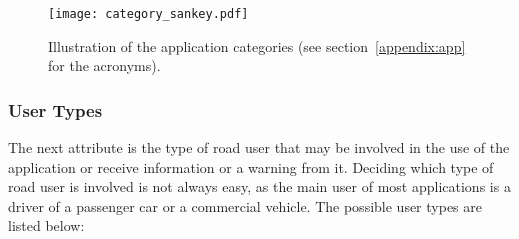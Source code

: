 
\begin{figure}[ht!]
  \begin{center}
    \texttt{[image: category\_sankey.pdf]}
    \caption{Illustration of the application categories (see section~\ref{appendix:app} for the acronyms).}
    \label{fig:app-category}
  \end{center}
\end{figure}

\subsubsection{User Types}
The next attribute is the type of road user that may be involved in the use of the application or receive information or a warning from it.
Deciding which type of road user is involved is not always easy, as the main user of most applications is a driver of a passenger car or a commercial vehicle. The possible user types are listed below:


